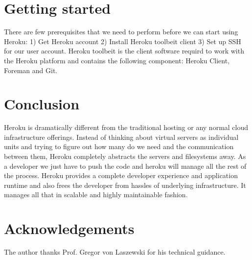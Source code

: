 \documentclass[9pt,twocolumn,twoside]{../../styles/osajnl}
\begin{document}
\section{Getting started}
	There are few prerequisites that we need to perform before we can start using
	Heroku: 1) Get Heroku account 2) Install Heroku toolbeit \SE client\cite{Toolbeit} 
	3) Set up SSH for our user account. Heroku toolbeit is the client software
	requird to work with the Heroku platform and contains the following component:
	Heroku Client, Foreman and Git. 

\section{Conclusion}
	Heroku is dramatically  different from the traditional hosting or any normal \TE {}
	cloud infrastructure offerings. Instead of thinking about virtual servers as
	individual units and trying to figure out how many do we need \GE and the
	communication between them, Heroku completely abstracts the servers and
	filesystems away. As a developer we just have to push the code and heroku will 
	manage all the rest of the process. Heroku provides a complete developer
	experience and application runtime and also frees the developer from hassles  of
	underlying infrastructure. It manages all that in scalable and highly
	maintainable fashion.

\section*{Acknowledgements}

	The author thanks Prof. Gregor von Laszewski for his technical guidance.



\end{document}
